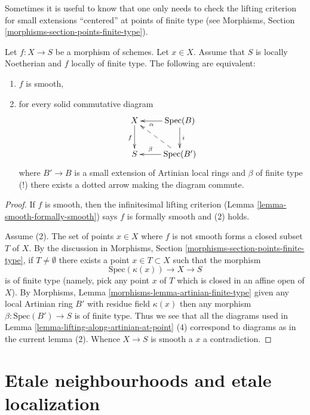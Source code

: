 \noindent
Sometimes it is useful to know that one only needs to check the
lifting criterion for small extensions ``centered'' at points
of finite type (see
Morphisms, Section \ref{morphisms-section-points-finite-type}).

\begin{lemma}
\label{lemma-lifting-along-artinian}
Let $f : X \to S$ be a morphism of schemes.
Let $x \in X$.
Assume that $S$ is locally Noetherian and $f$ locally of finite type.
The following are equivalent:
\begin{enumerate}
\item $f$ is smooth,
\item for every solid commutative diagram
$$
\xymatrix{
X \ar[d]_f & \text{Spec}(B) \ar[d]^i \ar[l]^-\alpha \\
S & \text{Spec}(B') \ar[l]_-{\beta} \ar@{-->}[lu]
}
$$
where $B' \to B$ is a small extension of Artinian local rings
and $\beta$ of finite type (!) there exists a dotted arrow making
the diagram commute.
\end{enumerate}
\end{lemma}

\begin{proof}
If $f$ is smooth, then the infinitesimal lifting criterion
(Lemma \ref{lemma-smooth-formally-smooth}) says
$f$ is formally smooth and (2) holds.

\medskip\noindent
Assume (2). The set of points $x \in X$ where $f$ is not smooth
forms a closed subset $T$ of $X$. By the discussion in Morphisms,
Section \ref{morphisms-section-points-finite-type}, if $T \not = \emptyset$
there exists a point $x \in T \subset X$ such that the morphism
$$
\text{Spec}(\kappa(x)) \to X \to S
$$
is of finite type (namely, pick any point $x$ of $T$ which is closed
in an affine open of $X$). By
Morphisms, Lemma \ref{morphisms-lemma-artinian-finite-type} given any
local Artinian ring $B'$ with residue field $\kappa(x)$ then any
morphism $\beta : \text{Spec}(B') \to S$ is of finite type. Thus
we see that all the diagrams used in
Lemma \ref{lemma-lifting-along-artinian-at-point} (4) correspond
to diagrams as in the current lemma (2). Whence $X \to S$ is smooth
a $x$ a contradiction.
\end{proof}










\section{Etale neighbourhoods and etale localization}
\label{section-etale-neighbourhoods}

